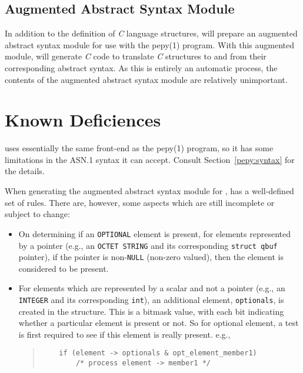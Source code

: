 \subsection	{Augmented Abstract Syntax Module}
In addition to the definition of {\em C\/} language structures,
 will prepare an augmented abstract syntax module for use with the
\man pepy(1) program.
With this augmented module,
 will generate {\em C\/} code to translate {\em C\/} structures to
and from their corresponding abstract syntax.
As this is entirely an automatic process,
the contents of the augmented abstract syntax module are relatively
unimportant.

\newpage
{}
\newpage

\section	{Known Deficiences}\label{posy:deficiencies}
 uses essentially the same front-end as the \man pepy(1) program,
so it has some limitations in the ASN.1 syntax it can accept.
Consult Section~\ref{pepy:syntax} for the details.

When generating the augmented abstract syntax module for ,
 has a well-defined set of rules.
There are, however, some aspects which are still incomplete or subject to
change:
\begin{itemize}
\item	On determining if an \verb"OPTIONAL" element is present,
	for elements represented by a pointer (e.g., an \verb"OCTET STRING"
	and its corresponding \verb"struct qbuf" pointer),
	if the pointer is non-\verb"NULL" (non-zero valued),
	then the element is considered to be present.

\item	For elements which are represented by a scalar and not a pointer
	(e.g., an \verb"INTEGER" and its corresponding \verb"int"),
	an additional element, \verb"optionals", is created in the 
	structure. This is a
	bitmask value, with each bit indicating whether a particular
	element is present or not. So for optional element, a test is
	first required to see if this element is really present. e.g.,
	\begin{quote}\small\begin{verbatim}
	if (element -> optionals & opt_element_member1)
	    /* process element -> member1 */
	\end{verbatim}\end{quote}		 

\end{itemize}

